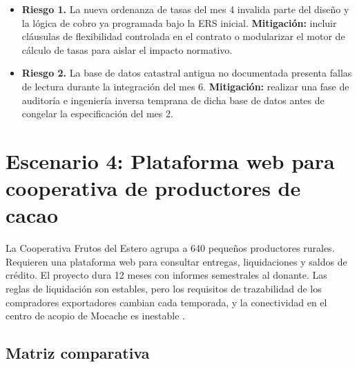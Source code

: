 \documentclass[11pt,a4paper]{article}
\begin{document}
\begin{itemize}
    \item \textbf{Riesgo 1.} La nueva ordenanza de tasas del mes 4 invalida parte del diseño y la lógica de cobro ya programada bajo la ERS inicial.
    \newline
    \textbf{Mitigación:} incluir cláusulas de flexibilidad controlada en el contrato o modularizar el motor de cálculo de tasas para aislar el impacto normativo.
    \item \textbf{Riesgo 2.} La base de datos catastral antigua no documentada presenta fallas de lectura durante la integración del mes 6.
    \newline
    \textbf{Mitigación:} realizar una fase de auditoría e ingeniería inversa temprana de dicha base de datos antes de congelar la especificación del mes 2.
\end{itemize}

\section{Escenario 4: Plataforma web para cooperativa de productores de cacao}

La Cooperativa Frutos del Estero agrupa a 640 pequeños productores rurales. Requieren una plataforma web para consultar entregas, liquidaciones y saldos de crédito. El proyecto dura 12 meses con informes semestrales al donante. Las reglas de liquidación son estables, pero los requisitos de trazabilidad de los compradores exportadores cambian cada temporada, y la conectividad en el centro de acopio de Mocache es inestable \cite[sec.~5.5]{materialGA}.

\subsection{Matriz comparativa}
\end{document}
